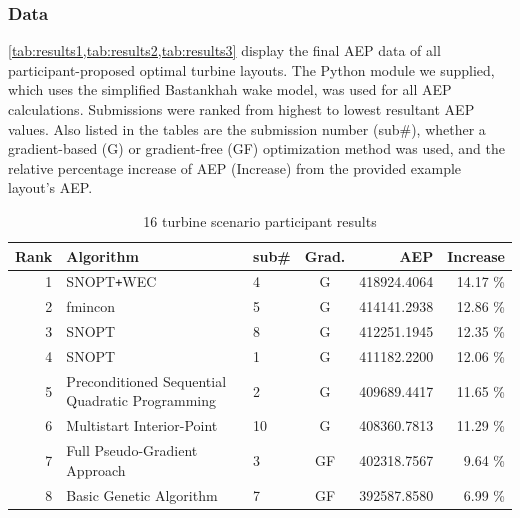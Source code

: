 	\subsubsection{Data}

	\cref{tab:results1,tab:results2,tab:results3} display the final AEP data of all participant-proposed optimal turbine layouts.
	The Python module we supplied, which uses the simplified Bastankhah wake model, was used for all AEP calculations.
	Submissions were ranked from highest to lowest resultant AEP values.
	Also listed in the tables are the submission number (sub\#), whether a gradient-based (G) or gradient-free (GF) optimization method was used, and the relative percentage increase of AEP (Increase) from the provided example layout's AEP.
	
		\begin{table}[htbp]
			\begin{center}
				\caption{16 turbine scenario participant results}
				\label{tab:results1}
				\begin{tabular}{r l l c r r}
					\hline
					Rank	& Algorithm											& sub\#	& Grad.	& AEP			& Increase		\\	%
					\hline
					1       & SNOPT\texttt{+}WEC								& 4     & G		& 418924.4064	&	14.17 \% 	\\ %
					2       & fmincon											& 5     & G		& 414141.2938	&	12.86 \% 	\\ %
					3       & SNOPT												& 8     & G		& 412251.1945	&	12.35 \% 	\\ %
					4       & SNOPT												& 1     & G		& 411182.2200	&	12.06 \% 	\\ %
					5       & Preconditioned Sequential Quadratic Programming	& 2     & G		& 409689.4417	&	11.65 \% 	\\ %
					6       & Multistart Interior-Point							& 10    & G		& 408360.7813	&	11.29 \% 	\\ %
					7       & Full Pseudo-Gradient Approach						& 3     & GF	& 402318.7567	&	9.64 \% 	\\ %
					8       & Basic Genetic Algorithm							& 7     & GF	& 392587.8580	&	6.99 \% 	\\ %

\end{tabular}
\end{center}
\end{table}
